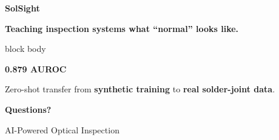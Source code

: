 \documentclass[aspectratio=169,11pt]{beamer}
\newcommand{\emphhighlight}[1]{\textcolor{primary}{\textbf{#1}}}
\begin{document}
\begin{frame}[plain]

\begin{center}

\vspace*{1.0cm}

{\fontsize{32}{36}\selectfont
\bfseries
\color{primary}
SolSight}

\vspace{0.45cm}

{\Large
\color{secondary}
\textbf{
Teaching inspection systems what ``normal'' looks like.
}}

\vspace{0.9cm}

\begin{beamercolorbox}[
    wd=0.78\paperwidth,
    rounded=true,
    shadow=true,
    sep=0.9em
  ]{block body}

\begin{center}

{\Large
\textbf{0.879 AUROC}
}

\vspace{0.15cm}

Zero-shot transfer from
\emphhighlight{synthetic training}
to
\emphhighlight{real solder-joint data}.

\end{center}

\end{beamercolorbox}

\vspace{1cm}

{\large
\textbf{Questions?}}

\vspace{0.55cm}

{\small
AI-Powered Optical Inspection
}

\end{center}

\end{frame}
\end{document}
